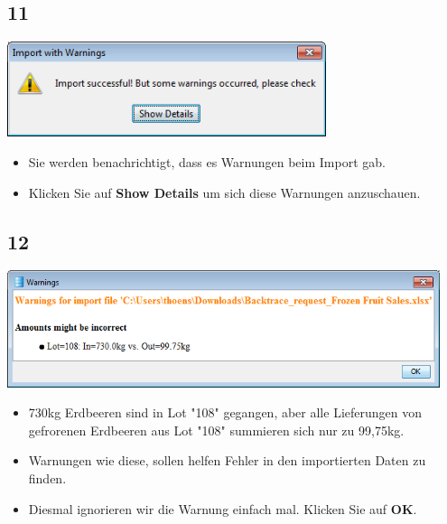 \documentclass{beamer}
\begin{document}
\subsection{11}
\begin{frame}
	\begin{center}
  		\includegraphics[width=0.7\textwidth]{11.png}
	\end{center}
	\begin{itemize}
		\item Sie werden benachrichtigt, dass es Warnungen beim Import gab.
		\item Klicken Sie auf \textbf{Show Details} um sich diese Warnungen anzuschauen.
	\end{itemize}
\end{frame}

\subsection{12}
\begin{frame}
	\begin{center}
  		\includegraphics[width=0.95\textwidth]{12.png}
	\end{center}
	\begin{itemize}
		\item 730kg Erdbeeren sind in Lot "108" gegangen, aber alle Lieferungen von gefrorenen Erdbeeren aus Lot "108" summieren sich nur zu 99,75kg.
		\item Warnungen wie diese, sollen helfen Fehler in den importierten Daten zu finden.
		\item Diesmal ignorieren wir die Warnung einfach mal. Klicken Sie auf \textbf{OK}.
	\end{itemize}
\end{frame}
\end{document}
